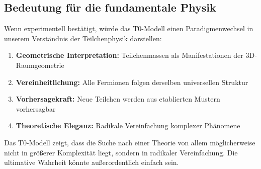 \subsection{Bedeutung für die fundamentale Physik}
\label{subsec:significance_physics}

Wenn experimentell bestätigt, würde das T0-Modell einen Paradigmenwechsel in unserem Verständnis der Teilchenphysik darstellen:

\begin{enumerate}
	\item \textbf{Geometrische Interpretation:} Teilchenmassen als Manifestationen der 3D-Raumgeometrie
	\item \textbf{Vereinheitlichung:} Alle Fermionen folgen derselben universellen Struktur
	\item \textbf{Vorhersagekraft:} Neue Teilchen werden aus etablierten Mustern vorhersagbar
	\item \textbf{Theoretische Eleganz:} Radikale Vereinfachung komplexer Phänomene
\end{enumerate}

Das T0-Modell zeigt, dass die Suche nach einer Theorie von allem möglicherweise nicht in größerer Komplexität liegt, sondern in radikaler Vereinfachung. Die ultimative Wahrheit könnte außerordentlich einfach sein.

